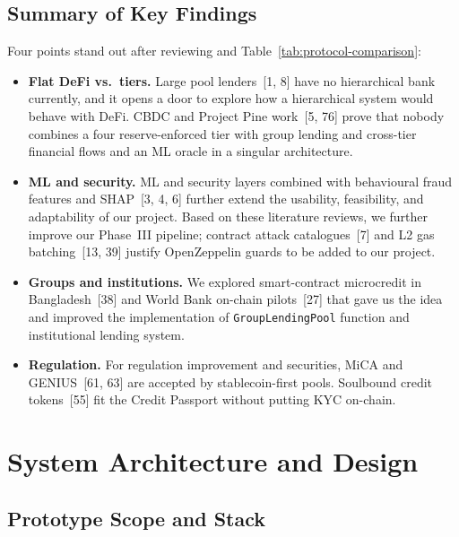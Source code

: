 \documentclass[12pt, a4paper]{report}
\begin{document}
\section{Summary of Key Findings}
\label{sec:lit-key-findings}

Four points stand out after reviewing and Table~\ref{tab:protocol-comparison}:

\begin{itemize}[noitemsep]
\item \textbf{Flat DeFi vs.\ tiers.} Large pool lenders~[1, 8] have no hierarchical bank currently, and it opens a door to explore how a hierarchical system would behave with DeFi. CBDC and Project Pine work~[5, 76] prove that nobody combines a four reserve-enforced tier with group lending and cross-tier financial flows and an ML oracle in a singular architecture.
\item \textbf{ML and security.} ML and security layers combined with behavioural fraud features and SHAP~[3, 4, 6] further extend the usability, feasibility, and adaptability of our project. Based on these literature reviews, we further improve our Phase~III pipeline; contract attack catalogues~[7] and L2 gas batching~[13, 39] justify OpenZeppelin guards to be added to our project.
\item \textbf{Groups and institutions.} We explored smart-contract microcredit in Bangladesh~[38] and World Bank on-chain pilots~[27] that gave us the idea and improved the implementation of \texttt{GroupLendingPool} function and institutional lending system.
\item \textbf{Regulation.} For regulation improvement and securities, MiCA and GENIUS~[61, 63] are accepted by stablecoin-first pools. Soulbound credit tokens~[55] fit the Credit Passport without putting KYC on-chain.
\end{itemize}

\chapter{System Architecture and Design}
\label{ch:architecture-compressed}

\section{Prototype Scope and Stack}
\label{sec:prototype-scope}
\end{document}

